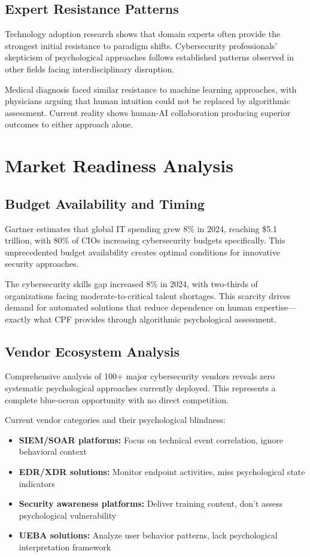 \documentclass[11pt,a4paper]{article}
\begin{document}
\subsection{Expert Resistance Patterns}

Technology adoption research shows that domain experts often provide the strongest initial resistance to paradigm shifts. Cybersecurity professionals' skepticism of psychological approaches follows established patterns observed in other fields facing interdisciplinary disruption.

Medical diagnosis faced similar resistance to machine learning approaches, with physicians arguing that human intuition could not be replaced by algorithmic assessment. Current reality shows human-AI collaboration producing superior outcomes to either approach alone.

\section{Market Readiness Analysis}

\subsection{Budget Availability and Timing}

Gartner estimates that global IT spending grew 8\% in 2024, reaching \$5.1 trillion, with 80\% of CIOs increasing cybersecurity budgets specifically\cite{gartner2024}. This unprecedented budget availability creates optimal conditions for innovative security approaches.

The cybersecurity skills gap increased 8\% in 2024, with two-thirds of organizations facing moderate-to-critical talent shortages\cite{wef2025}. This scarcity drives demand for automated solutions that reduce dependence on human expertise—exactly what CPF provides through algorithmic psychological assessment.

\subsection{Vendor Ecosystem Analysis}

Comprehensive analysis of 100+ major cybersecurity vendors reveals zero systematic psychological approaches currently deployed. This represents a complete blue-ocean opportunity with no direct competition.

Current vendor categories and their psychological blindness:
\begin{itemize}
\item \textbf{SIEM/SOAR platforms:} Focus on technical event correlation, ignore behavioral context
\item \textbf{EDR/XDR solutions:} Monitor endpoint activities, miss psychological state indicators  
\item \textbf{Security awareness platforms:} Deliver training content, don't assess psychological vulnerability
\item \textbf{UEBA solutions:} Analyze user behavior patterns, lack psychological interpretation framework
\end{itemize}
\end{document}
